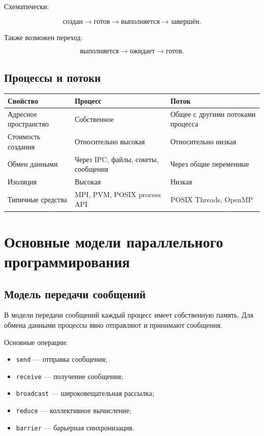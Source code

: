 \documentclass[12pt,a4paper]{article}
\begin{document}
Схематически:

\[
\text{создан} \rightarrow \text{готов} \rightarrow \text{выполняется} \rightarrow \text{завершён}.
\]

Также возможен переход:

\[
\text{выполняется} \rightarrow \text{ожидает} \rightarrow \text{готов}.
\]

\subsection{Процессы и потоки}

\begin{center}
\begin{tabular}{|p{5cm}|p{5cm}|p{5cm}|}
\hline
\textbf{Свойство} & \textbf{Процесс} & \textbf{Поток} \\
\hline
Адресное пространство & Собственное & Общее с другими потоками процесса \\
\hline
Стоимость создания & Относительно высокая & Относительно низкая \\
\hline
Обмен данными & Через IPC, файлы, сокеты, сообщения & Через общие переменные \\
\hline
Изоляция & Высокая & Низкая \\
\hline
Типичные средства & MPI, PVM, POSIX process API & POSIX Threads, OpenMP \\
\hline
\end{tabular}
\end{center}

\section{Основные модели параллельного программирования}

\subsection{Модель передачи сообщений}

В модели передачи сообщений каждый процесс имеет собственную память. Для обмена данными процессы явно отправляют и принимают сообщения.

Основные операции:
\begin{itemize}
    \item \texttt{send} --- отправка сообщения;
    \item \texttt{receive} --- получение сообщения;
    \item \texttt{broadcast} --- широковещательная рассылка;
    \item \texttt{reduce} --- коллективное вычисление;
    \item \texttt{barrier} --- барьерная синхронизация.
\end{itemize}
\end{document}
